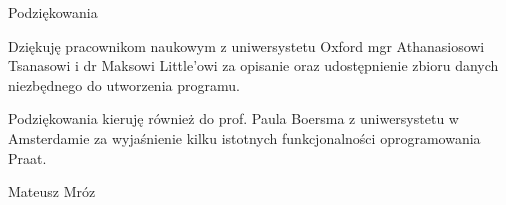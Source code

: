 \noindent
{\Large Podziękowania}
\bigskip

Dziękuję pracownikom naukowym z uniwersystetu Oxford mgr Athanasiosowi Tsanasowi i dr Maksowi Little'owi za opisanie oraz udostępnienie zbioru danych niezbędnego do utworzenia programu.

\bigskip
Podziękowania kieruję również do prof. Paula Boersma z uniwersystetu w Amsterdamie za wyjaśnienie kilku istotnych funkcjonalności oprogramowania Praat. 

\bigskip

{\raggedleft
Mateusz Mróz
}

